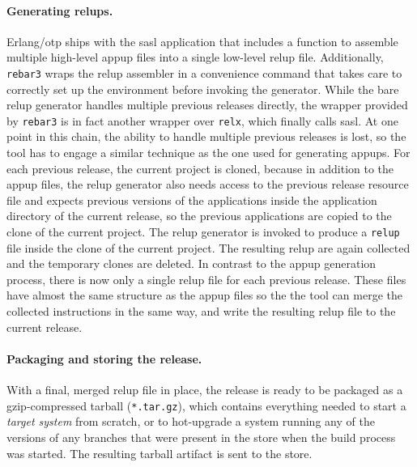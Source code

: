 {\paragraph{Generating relups.} Erlang/\acrshort{otp} ships with the \acrfull{sasl} application that includes a function to assemble multiple high-level \acrfull{appup} files into a single low-level \acrfull{relup} file. Additionally, \lstinline|rebar3| wraps the \acrshort{relup} assembler in a convenience command that takes care to correctly set up the environment before invoking the generator. While the bare \acrshort{relup} generator handles multiple previous releases directly, the wrapper provided by \lstinline|rebar3| is in fact another wrapper over \lstinline|relx|, which finally calls \acrshort{sasl}. At one point in this chain, the ability to handle multiple previous releases is lost, so the tool has to engage a similar technique as the one used for generating \acrshort{appup}s. For each previous release, the current project is cloned, because in addition to the \acrshort{appup} files, the \acrshort{relup} generator also needs access to the previous release resource file and expects previous versions of the applications inside the application directory of the current release, so the previous applications are copied to the clone of the current project. The \acrshort{relup} generator is invoked to produce a \lstinline|relup| file inside the clone of the current project. The resulting \acrlong{relup} are again collected and the temporary clones are deleted. In contrast to the \acrshort{appup} generation process, there is now only a single \acrshort{relup} file for each previous release. These files have almost the same structure as the \acrshort{appup} files so the the tool can merge the collected instructions in the same way, and write the resulting \acrshort{relup} file to the current release.

\paragraph{Packaging and storing the release.} With a final, merged \acrfull{relup} file in place, the release is ready to be packaged as a gzip-compressed tarball (\lstinline|*.tar.gz|), which contains everything needed to start a \emph{target system} from scratch, or to hot-upgrade a system running any of the versions of any branches that were present in the store when the build process was started. The resulting tarball artifact is sent to the store.

}
